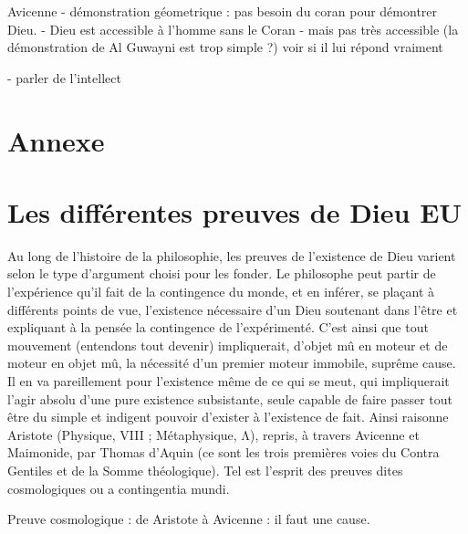 Avicenne
- démonstration géometrique : pas besoin du coran pour démontrer Dieu. 
- Dieu est accessible à l'homme sans le Coran
- mais pas très accessible (la démonstration de Al Guwayni est trop simple ?) voir si il lui répond vraiment

- parler de l'intellect 



\hypertarget{annexe}{%
\section{Annexe}\label{annexe}}

\section{Les différentes preuves de Dieu EU}
Au long de l'histoire de la philosophie, les preuves de l'existence de Dieu varient selon le type d'argument choisi pour les fonder. Le philosophe peut partir de l'expérience qu'il fait de la contingence du monde, et en inférer, se plaçant à différents points de vue, l'existence nécessaire d'un Dieu soutenant dans l'être et expliquant à la pensée la contingence de l'expérimenté. C'est ainsi que tout mouvement (entendons tout devenir) impliquerait, d'objet mû en moteur et de moteur en objet mû, la nécessité d'un premier moteur immobile, suprême cause. Il en va pareillement pour l'existence même de ce qui se meut, qui impliquerait l'agir absolu d'une pure existence subsistante, seule capable de faire passer tout être du simple et indigent pouvoir d'exister à l'existence de fait. Ainsi raisonne Aristote (Physique, VIII ; Métaphysique, Λ), repris, à travers Avicenne et Maimonide, par Thomas d'Aquin (ce sont les trois premières voies du Contra Gentiles et de la Somme théologique). Tel est l'esprit des preuves dites cosmologiques ou a contingentia mundi.

\begin{Synthesis}
Preuve cosmologique : de Aristote à Avicenne : il faut une cause.
\end{Synthesis}


